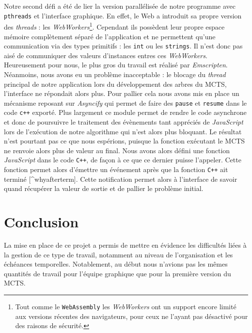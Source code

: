 \documentclass[a4paper,11pt]{article}
\begin{document}
Notre second défi a été de lier la version parallélisée de notre
programme avec \texttt{pthreads}\citep{pthreads_emscripten} et
l'interface graphique. En effet, le Web a introduit sa propre version
des \emph{threads} : les \emph{WebWorkers}\footnote{Tout comme le
  \texttt{WebAssembly} les \emph{WebWorkers} ont un support encore
  limité aux versions récentes des navigateurs, pour ceux ne l'ayant pas
  désactivé pour des raisons de sécurité.}. Cependant ils possèdent leur
propre espace mémoire complètement séparé de l'application et ne
permettent qu'une communication via des types primitifs : les
\texttt{int} ou les \texttt{strings}. Il n'est donc pas aisé de
communiquer des valeurs d'instances entres ces \emph{WebWorkers}.
Heureusement pour nous, le plus gros du travail est réalisé par
\emph{Emscripten}. Néanmoins, nous avons eu un problème inacceptable :
le blocage du \emph{thread} principal de notre application lors du
développement des arbres du MCTS, l'interface ne répondait alors plus.
Pour pallier cela nous avons mis en place un mécanisme reposant sur
\emph{Asyncify} \citep{asyncify} qui permet de faire des \texttt{pause}
et \texttt{resume} dans le code \texttt{c++} exporté. Plus largement ce
module permet de rendre le code asynchrone et donc de poursuivre le
traitement des évènements tant appréciés de \emph{JavaScript} lors de
l'exécution de notre algorithme qui n'est alors plus bloquant. Le
résultat n'est pourtant pas ce que nous espérions, puisque la fonction
exécutant le MCTS ne renvoie alors plus de valeur au final. Nous avons
alors défini une fonction \emph{JavaScript} dans le code \texttt{C++},
de façon à ce que ce dernier puisse l'appeler. Cette fonction permet
alors d'émettre un événement après que la fonction \texttt{C++} ait
terminé {[}\^{}whyafterterm{]}. Cette notification permet alors à
l'interface de savoir quand récupérer la valeur de sortie et de pallier
le problème initial.

\section*{Conclusion}\label{conclusion}

La mise en place de ce projet a permis de mettre en évidence les
difficultés liées à la gestion de ce type de travail, notamment au
niveau de l'organisation et les échéances temporelles. Notablement, au
début nous n'avions pas les mêmes quantités de travail pour l'équipe
graphique que pour la première version du MCTS.
\end{document}
